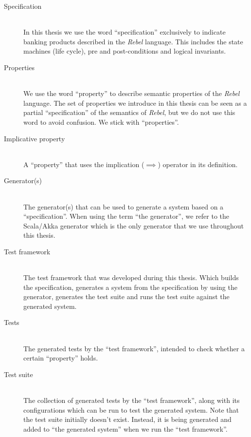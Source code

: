 \begin{description}
\item[Specification]\hfill\\
In this thesis we use the word ``specification'' exclusively to indicate
banking products described in the \textit{Rebel} language. This includes the
state machines (life cycle), pre and post-conditions and logical invariants.

\item[Properties]\hfill\\
We use the word ``property'' to describe semantic properties of the
\textit{Rebel} language. The set of properties we introduce in this thesis can
be seen as a partial ``specification'' of the semantics of \textit{Rebel}, but
we do not use this word to avoid confusion. We stick with ``properties''.

\item[Implicative property]\hfill\\
A ``property'' that uses the implication ($\implies$) operator in its
definition.

\item[Generator(s)]\hfill\\
The generator(s) that can be used to generate a system based on a
``specification''. When using the term ``the generator'', we refer to the
Scala/Akka generator which is the only generator that we use throughout this
thesis.

\item[Test framework]\hfill\\
The test framework that was developed during this thesis. Which builds the
specification, generates a system from the specification by using the generator,
generates the test suite and runs the test suite against the generated system.


\item[Tests]\hfill\\
The generated tests by the ``test framework'', intended to check whether a
certain ``property'' holds.

\item[Test suite]\hfill\\
The collection of generated tests by the ``test framework'', along with its configurations which can
be run to test the generated system. Note that the test suite initially doesn't
exist. Instead, it is being generated and added to ``the generated system'' when
we run the ``test framework''.


\end{description}

